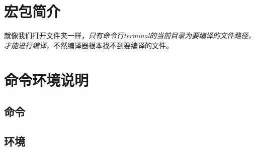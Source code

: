\documentclass{xdyy-usermanual}
\begin{document}
\maketitle
\tableofcontents


\section{宏包简介}
就像我们打开文件夹一样，\emph{只有命令行terminal的当前目录为要编译的文件路径，才能进行编译}，不然编译器根本找不到要编译的文件。

\section{命令环境说明}


\subsection{命令}


\subsection{环境}
\end{document}
